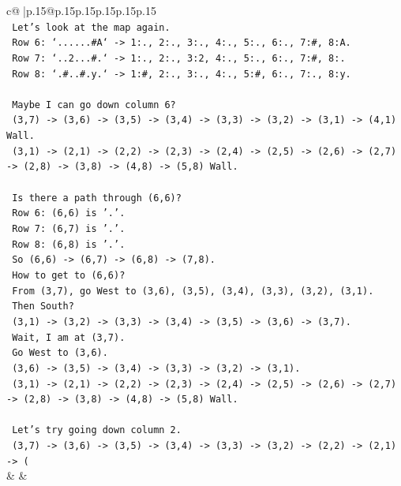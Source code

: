 \documentclass{article}
\begin{document}
{\begin{supertabular}{c@{$\;$}|p{.15\linewidth}@{}p{.15\linewidth}p{.15\linewidth}p{.15\linewidth}p{.15\linewidth}p{.15\linewidth}}
{{{\\ 
\texttt{       Let's look at the map again.} \\
\texttt{       Row 6: `......\#A` {-}> 1:., 2:., 3:., 4:., 5:., 6:., 7:\#, 8:A.} \\
\texttt{       Row 7: `..2...\#.` {-}> 1:., 2:., 3:2, 4:., 5:., 6:., 7:\#, 8:.} \\
\texttt{       Row 8: `.\#..\#.y.` {-}> 1:\#, 2:., 3:., 4:., 5:\#, 6:., 7:., 8:y.} \\
\\ 
\texttt{       Maybe I can go down column 6?} \\
\texttt{       (3,7) {-}> (3,6) {-}> (3,5) {-}> (3,4) {-}> (3,3) {-}> (3,2) {-}> (3,1) {-}> (4,1) Wall.} \\
\texttt{       (3,1) {-}> (2,1) {-}> (2,2) {-}> (2,3) {-}> (2,4) {-}> (2,5) {-}> (2,6) {-}> (2,7) {-}> (2,8) {-}> (3,8) {-}> (4,8) {-}> (5,8) Wall.} \\
\\ 
\texttt{       Is there a path through (6,6)?} \\
\texttt{       Row 6: (6,6) is '.'.} \\
\texttt{       Row 7: (6,7) is '.'.} \\
\texttt{       Row 8: (6,8) is '.'.} \\
\texttt{       So (6,6) {-}> (6,7) {-}> (6,8) {-}> (7,8).} \\
\texttt{       How to get to (6,6)?} \\
\texttt{       From (3,7), go West to (3,6), (3,5), (3,4), (3,3), (3,2), (3,1).} \\
\texttt{       Then South?} \\
\texttt{       (3,1) {-}> (3,2) {-}> (3,3) {-}> (3,4) {-}> (3,5) {-}> (3,6) {-}> (3,7).} \\
\texttt{       Wait, I am at (3,7).} \\
\texttt{       Go West to (3,6).} \\
\texttt{       (3,6) {-}> (3,5) {-}> (3,4) {-}> (3,3) {-}> (3,2) {-}> (3,1).} \\
\texttt{       (3,1) {-}> (2,1) {-}> (2,2) {-}> (2,3) {-}> (2,4) {-}> (2,5) {-}> (2,6) {-}> (2,7) {-}> (2,8) {-}> (3,8) {-}> (4,8) {-}> (5,8) Wall.} \\
\\ 
\texttt{       Let's try going down column 2.} \\
\texttt{       (3,7) {-}> (3,6) {-}> (3,5) {-}> (3,4) {-}> (3,3) {-}> (3,2) {-}> (2,2) {-}> (2,1) {-}> (} \\
            }
        }
    }
    & & \\ \\


\end{supertabular}}
\end{document}
